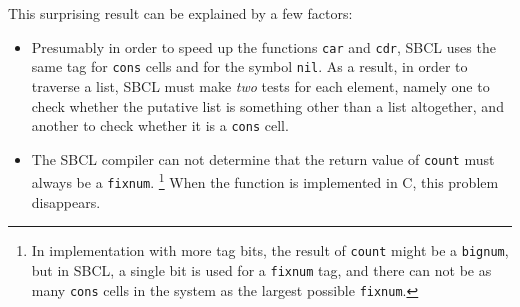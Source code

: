 This surprising result can be explained by a few factors:

\begin{itemize}
\item Presumably in order to speed up the functions \texttt{car} and
  \texttt{cdr}, SBCL uses the same tag for \texttt{cons} cells and for
  the symbol \texttt{nil}.  As a result, in order to traverse a list,
  SBCL must make \emph{two} tests for each element, namely one to
  check whether the putative list is something other than a list
  altogether, and another to check whether it is a \texttt{cons}
  cell.
\item The SBCL compiler can not determine that the return value of
  \texttt{count} must always be a \texttt{fixnum}.%
  \footnote{In implementation with more tag bits, the result of
    \texttt{count} might be a \texttt{bignum}, but in SBCL, a single
    bit is used for a \texttt{fixnum} tag, and there can not be as
    many \texttt{cons} cells in the system as the largest possible
    \texttt{fixnum}.}
  When the function is implemented in C, this problem disappears.
\end{itemize}
